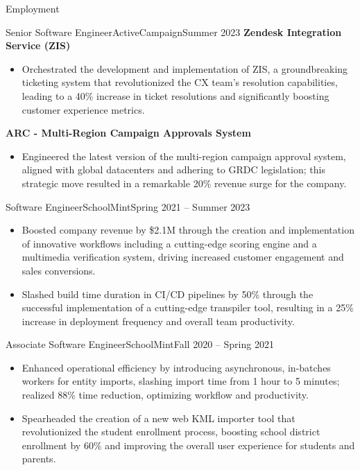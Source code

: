 \documentclass[]{mcdowellcv}
\begin{document}
	\makeheader
	\begin{cvsection}{Employment}
		\begin{cvsubsection}{Senior Software Engineer}{ActiveCampaign}{Summer 2023}
			\textbf{Zendesk Integration Service (ZIS)}
			\begin{itemize}
				\item Orchestrated the development and implementation of ZIS, a groundbreaking ticketing system that revolutionized the CX team's resolution capabilities, leading to a 40\% increase in ticket resolutions and significantly boosting customer experience metrics.
			\end{itemize}
			\textbf{ARC - Multi-Region Campaign Approvals System}
			\begin{itemize}
				\item Engineered the latest version of the multi-region campaign approval system, aligned with global datacenters and adhering to GRDC legislation; this strategic move resulted in a remarkable 20\% revenue surge for the company.
			\end{itemize}
		\end{cvsubsection}
		\begin{cvsubsection}{Software Engineer}{SchoolMint}{Spring 2021 -- Summer 2023}		
			\begin{itemize}
				\item Boosted company revenue by \$2.1M through the creation and implementation of innovative workflows including a cutting-edge scoring engine and a multimedia verification system, driving increased customer engagement and sales conversions.
				\item Slashed build time duration in CI/CD pipelines by 50\% through the successful implementation of a cutting-edge transpiler tool, resulting in a 25\% increase in deployment frequency and overall team productivity.
			\end{itemize}
		\end{cvsubsection}
		\begin{cvsubsection}{Associate Software Engineer}{SchoolMint}{Fall 2020 -- Spring 2021}	
			\begin{itemize}
				\item Enhanced operational efficiency by introducing asynchronous, in-batches workers for entity imports, slashing import time from 1 hour to 5 minutes; realized 88\% time reduction, optimizing workflow and productivity.
				\item Spearheaded the creation of a new web KML importer tool that revolutionized the student enrollment process, boosting school district enrollment by 60\% and improving the overall user experience for students and parents.

\end{itemize}
\end{cvsubsection}
\end{cvsection}
\end{document}
